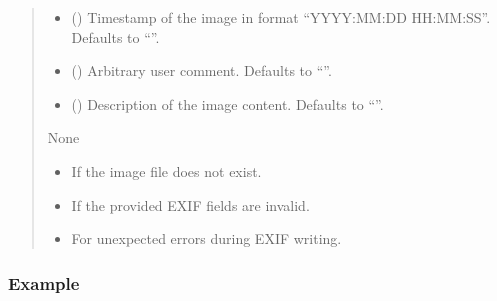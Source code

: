 \documentclass[letterpaper,10pt,english]{sphinxmanual}
\begin{document}
\begin{fulllineitems}
\begin{quote}
\begin{description}
\begin{itemize}
\item {} 
\sphinxAtStartPar
{} (\sphinxstyleliteralemphasis{\sphinxupquote{, }}) \textendash{} Timestamp of the image in format
“YYYY:MM:DD HH:MM:SS”. Defaults to “”.

\item {} 
\sphinxAtStartPar
{} (\sphinxstyleliteralemphasis{\sphinxupquote{, }}) \textendash{} Arbitrary user comment. Defaults to “”.

\item {} 
\sphinxAtStartPar
{} (\sphinxstyleliteralemphasis{\sphinxupquote{, }}) \textendash{} Description of the image content. Defaults to “”.

\end{itemize}

\sphinxAtStartPar
None

\begin{itemize}
\item {} 
\sphinxAtStartPar
{} \textendash{} If the image file does not exist.

\item {} 
\sphinxAtStartPar
{} \textendash{} If the provided EXIF fields are invalid.

\item {} 
\sphinxAtStartPar
{} \textendash{} For unexpected errors during EXIF writing.

\end{itemize}

\end{description}\end{quote}
\subsubsection*{Example}


\end{fulllineitems}
\end{document}
